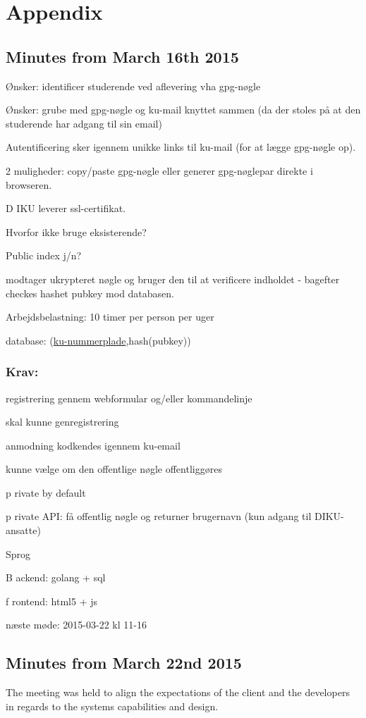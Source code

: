 \documentclass[11pt,a4paper]{report}
\let\OldItem\item
\newcommand{\SubItemStart}[1]{%
    \let\item\SubItemEnd
    \begin{SubItemList}[resume]%
        \OldItem #1%
}
\newcommand{\SubItemMiddle}[1]{%
    \OldItem #1%
}
\newcommand{\SubItemEnd}[1]{%
    \end{SubItemList}%
    \let\item\OldItem
    \item #1%
}
\newcommand*{\SubItem}[1]{%
    \let\SubItem\SubItemMiddle%
    \SubItemStart{#1}%
}%
\begin{document}
\newpage
\section{Appendix}
\subsection{Minutes from March 16th 2015}
\begin{itemize}
\item Ønsker: identificer studerende ved aflevering vha gpg-nøgle
\item Ønsker: grube med gpg-nøgle og ku-mail knyttet sammen (da der stoles på at den studerende har adgang til sin email)
\item Autentificering sker igennem unikke links til ku-mail (for at lægge gpg-nøgle op).
\SubItem 2 muligheder: copy/paste gpg-nøgle eller generer gpg-nøglepar direkte i browseren.
\item DIKU leverer ssl-certifikat.
\item Hvorfor ikke bruge eksisterende?
\item Public index j/n?
\item modtager ukrypteret nøgle og bruger den til at verificere indholdet - bagefter checkes hashet pubkey mod databasen.
\item Arbejdsbelastning: 10 timer per person per uger
\item database: (\underline{ku-nummerplade},hash(pubkey))
\end{itemize}
\subsubsection{Krav:}
\begin{itemize}
\item registrering gennem webformular og/eller kommandelinje
\item skal kunne genregistrering
\item anmodning kodkendes igennem ku-email
\item kunne vælge om den offentlige nøgle offentliggøres
\SubItem private by default
\item private API: få offentlig nøgle og returner brugernavn (kun adgang til DIKU-ansatte)
\item Sprog
\SubItem Backend: golang + sql
\SubItem frontend: html5 + js
\end{itemize}

næste møde:
2015-03-22 kl 11-16

\subsection{Minutes from March 22nd 2015}
The meeting was held to align the expectations of the client and the developers in regards to the systems capabilities and design.
\end{document}
